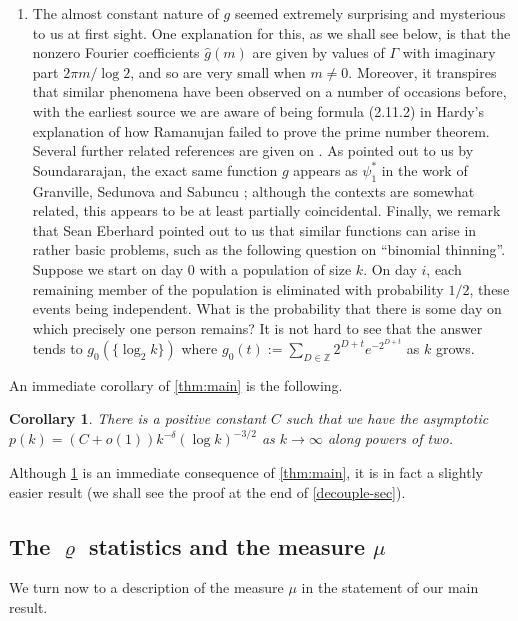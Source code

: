 \documentclass[11pt,reqno]{amsart}
\numberwithin{equation}{section}
\newtheorem{corollary}[theorem]{Corollary}
\theoremstyle{definition}
\theoremstyle{remark}
\newcommand{\wh}{\widehat}
\newcommand\Z{\mathbb{Z}}
\begin{document}
\begin{enumerate}
\item The almost constant nature of $g$ seemed extremely surprising and mysterious to us at first sight. One explanation for this, as we shall see below, is that the nonzero Fourier coefficients $\wh{g}(m)$ are given by values of $\Gamma$ with imaginary part $2 \pi m /\log 2$, and so are very small when $m \ne 0$. Moreover, it transpires that similar phenomena have been observed on a number of occasions before, with the earliest source we are aware of being formula (2.11.2) in Hardy's explanation \cite{hardy-ramanujan} of how Ramanujan failed to prove the prime number theorem. Several further related references are given on \cite[p 311]{flajolet-sedgewick}. As pointed out to us by Soundararajan, the exact same function $g$ appears as $\psi_1^*$ in the work of Granville, Sedunova and Sabuncu \cite{granville-sedunova-sabuncu}; although the contexts are somewhat related, this appears to be at least partially coincidental. Finally, we remark that Sean Eberhard pointed out to us that similar functions can arise in rather basic problems, such as the following question on ``binomial thinning''. Suppose we start on day 0 with a population of size $k$. On day $i$, each remaining member of the population is eliminated with probability $1/2$, these events being independent. What is the probability that there is some day on which precisely one person remains? It is not hard to see that the answer tends to $g_0(\{ \log_2 k\})$ where $g_0(t) := \sum_{D \in \Z} 2^{D + t} e^{-2^{D + t}}$ as $k$ grows. 
\end{enumerate}

An immediate corollary of \cref{thm:main} is the following.

\begin{corollary}\label{powers-two-cor}
   There is a positive constant $C$ such that we have the asymptotic $p(k) = (C + o(1)) k^{-\delta} (\log k)^{-3/2}$ as $k \rightarrow \infty$ along powers of two.
\end{corollary}
Although \cref{powers-two-cor} is an immediate consequence of \cref{thm:main}, it is in fact a slightly easier result (we shall see the proof at the end of \cref{decouple-sec}).



\subsection{The $\varrho$ statistics and the measure $\mu$}\label{rho-stat-sec}
We turn now to a description of the measure $\mu$ in the statement of our main result.
\end{document}
